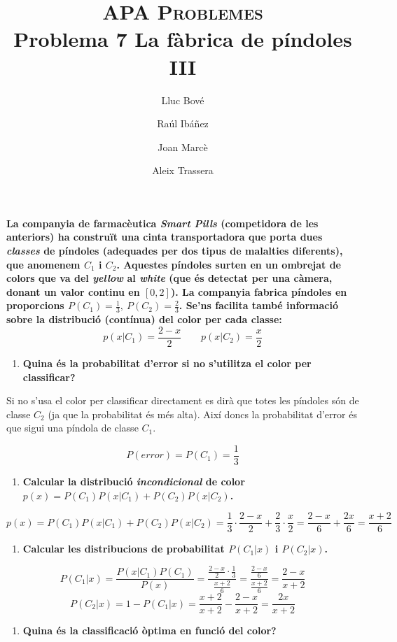 \documentclass[a4paper]{article}
\title{\textsc{APA Problemes} \\ Problema 7 La fàbrica de píndoles III}
\author{Lluc Bové \and Raúl Ibáñez \and Joan Marcè \and Aleix Trassera}
\date{}
\begin{document}
\maketitle

\textbf{La companyia de farmacèutica \emph{Smart Pills} (competidora de les anteriors) ha construït una cinta transportadora que porta dues \emph{classes} de píndoles (adequades per dos tipus de malalties diferents), que anomenem $C_1$ i $C_2$. Aquestes píndoles surten en un ombrejat de colors que va del \emph{yellow} al \emph{white} (que és detectat per una càmera, donant un valor continu en $[0,2]$). La companyia fabrica píndoles en proporcions $P(C_1) = \frac{1}{3},\ P(C_2) = \frac{2}{3}$. Se'ns facilita també informació sobre la distribució (contínua) del color per cada classe: }
$$
p(x|C_1) = \frac{2 - x}{2} \qquad p(x|C_2) = \frac{x}{2}
$$

\begin{enumerate}
	\item \textbf{Quina és la probabilitat d'error si no s'utilitza el color per classificar?}
\end{enumerate}

Si no s'usa el color per classificar directament es dirà que totes les píndoles són de classe $C_2$ (ja que la probabilitat és més alta). Així doncs la probabilitat d'error és que sigui una píndola de classe $C_1$.

$$
P(error) = P(C_1) = \frac{1}{3}
$$

\begin{enumerate}[resume]
	\item \textbf{Calcular la distribució \emph{incondicional} de color $p(x) = P(C_1)P(x|C_1) + P(C_2)P(x|C_2)$.}
\end{enumerate}
$$
p(x) = P(C_1)P(x|C_1) + P(C_2)P(x|C_2) = \frac{1}{3}·\frac{2 - x}{2} + \frac{2}{3}·\frac{x}{2} = \frac{2 - x}{6} + \frac{2x}{6} = \boxed{\frac{x + 2}{6}} 
$$

\begin{enumerate}[resume]
	\item \textbf{Calcular les distribucions de probabilitat $P(C_1|x)$ i $P(C_2|x)$.}
\end{enumerate}
$$
P(C_1|x) = \frac{P(x|C_1)P(C_1)}{P(x)} = 
\frac{\frac{2 - x}{2}·\frac{1}{3}}{\frac{x + 2}{6}} =
\frac{\frac{2 - x}{6}}{\frac{x + 2}{6}} = \boxed{\frac{2 - x}{x + 2}}
$$
$$
P(C_2|x) = 1 - P(C_1|x) = \frac{x + 2}{x + 2} - \frac{2 - x}{x + 2} =
\boxed{\frac{2x}{x + 2}}
$$

\begin{enumerate}[resume]
	\item \textbf{Quina és la classificació òptima en funció del color?}
\end{enumerate}
\end{document}
